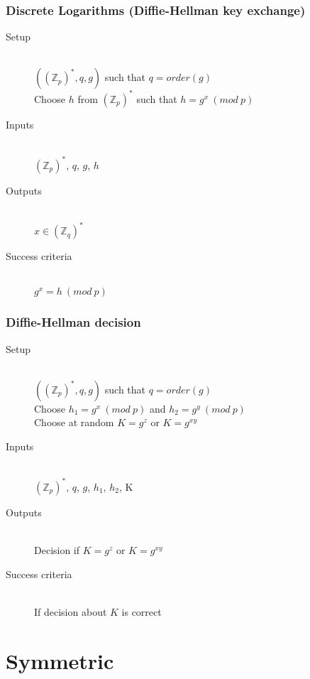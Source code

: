 \documentclass[a4paper]{article}
\begin{document}
\subsubsection{Discrete Logarithms (Diffie-Hellman key exchange)}

\begin{description}
  \item[Setup] \hfill \\
    $((\mathbb{Z}_{p})^{*}, q, g)$ such that $q = order(g)$ \\
    Choose $h$ from $(\mathbb{Z}_{p})^{*}$ such that $h = g^{x} \: (mod \: p)$
  \item[Inputs] \hfill \\
    $(\mathbb{Z}_{p})^{*}$, $q$, $g$, $h$
  \item[Outputs] \hfill \\
    $x \in (\mathbb{Z}_{q})^{*}$
  \item[Success criteria] \hfill \\
    $g^{x} = h \: (mod \: p)$
\end{description}

\subsubsection{Diffie-Hellman decision}

\begin{description}
  \item[Setup] \hfill \\
    $((\mathbb{Z}_{p})^{*}, q, g)$ such that $q = order(g)$ \\
    Choose $h_{1} = g^{x} \: (mod \: p)$ and $h_{2} = g^{y} \: (mod \: p)$ \\
    Choose at random $K = g^{z}$ or $K = g^{xy}$
  \item[Inputs] \hfill \\
    $(\mathbb{Z}_{p})^{*}$, $q$, $g$, $h_{1}$, $h_{2}$, K
  \item[Outputs] \hfill \\
    Decision if $K = g^{z}$ or $K = g^{xy}$
  \item[Success criteria] \hfill \\
    If decision about $K$ is correct
\end{description}

\section{Symmetric}
\end{document}
